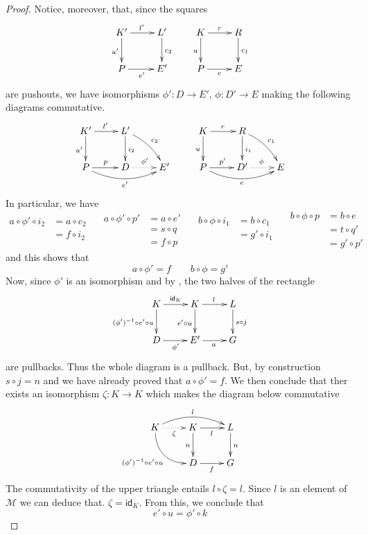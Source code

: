 \documentclass[a4paper]{article}
\newcommand{\id}[1]{\mathsf{id}_{#1}}
\def\D{\textbf {\textup{D}}}
\theoremstyle{definition}
\begin{document}
\begin{proof}
	Notice, moreover, that, since the squares
	\[\xymatrix{K' \ar[d]_{u'} \ar[r]^{l'}& L' \ar[d]^{c_2} & K \ar[r]^{r}\ar[d]_{u} & R \ar[d]^{c_1}\\ P \ar[r]_{e'} & E' & P\ar[r]_e & E}\]
	are pushouts, we have isomorphisms  $\phi'\colon D\to E'$, $\phi\colon D'\to E$ making the following diagrams commutative.
	\[\xymatrix{K' \ar[d]_{u'} \ar[r]^{l'}& L'\ar[d]^{i_2}  \ar@/^.2cm/[dr]^{c_2} & &K \ar[r]^{r}\ar[d]_{u} & R \ar[d]^{i_1} \ar@/^.2cm/[dr]^{c_1}\\ P \ar@/_.4cm/[rr]_{e'}\ar[r]^{p} & D\ar@{.>}[r]^{\phi'} &E'& P\ar@/_.4cm/[rr]_{e}\ar[r]^{p'} & D'\ar@{.>}[r]^{\phi}& E}\]
	In particular, we have
	\[\begin{split}
		a\circ \phi' \circ i_2&=a \circ c_2\\&=f\circ i_2\\&
	\end{split}\quad \begin{split}
	a\circ \phi' \circ p'&=a \circ e'\\&=s\circ q\\&=f\circ p
	\end{split}\quad \begin{split}
	b\circ \phi \circ i_1&=b \circ c_1\\&=g'\circ i_1\\&
	\end{split}\quad \begin{split}
	b\circ \phi \circ p&=b \circ e\\&=t\circ q'\\&=g'\circ p'
	\end{split} \]
	and this shows that 
	\[a\circ \phi'=f \qquad b\circ \phi = g'\]
	Now, since $\phi'$ is an isomorphism and by , the two halves of the rectangle
	\[\xymatrix{K\ar[r]^{\id{K}} \ar[d]_{(\phi')^{-1} \circ e' \circ u}&K\ar[d]_{e'\circ u} \ar[r]^{l} & L \ar[d]^{s\circ j} \\D\ar[r]_{\phi'} & E' \ar[r]_{a}&G}\]
	are pullbacks. Thus the whole diagram is a pullback. But, by construction $s\circ j =n$ and we have already proved that $a\circ \phi'=f$. We then conclude that ther exists an isomorphism $\zeta\colon K\to K$ which makes the diagram below commutative
	\[\xymatrix{K \ar@{.>}[r]_{\zeta}\ar@/^.4cm/[rr]^{l}  \ar@/_.5cm/[dr]_{(\phi')^{-1} \circ e' \circ u}& K \ar[r]_{l} \ar[d]_{n} & L \ar[d]^{n} \\ & D \ar[r]_{f} & G}\]
	The commutativity of the upper triangle entails $l\circ \zeta=l$. Since $l$ is an element of $\mathcal{M}$  we can deduce that. $\zeta=\id{K}$. From this, we conclude that
	\[e'\circ u = \phi' \circ k\]
	

\end{proof}
\end{document}
